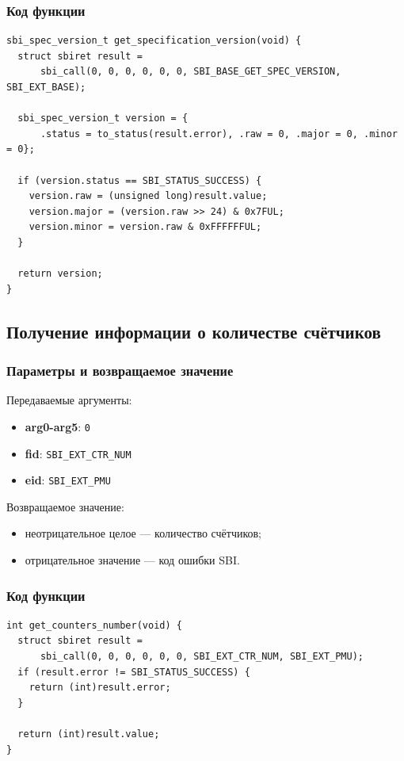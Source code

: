 \documentclass[12pt,a4paper]{report}
\begin{document}
\subsubsection*{Код функции}
\begin{verbatim}
sbi_spec_version_t get_specification_version(void) {
  struct sbiret result =
      sbi_call(0, 0, 0, 0, 0, 0, SBI_BASE_GET_SPEC_VERSION, SBI_EXT_BASE);

  sbi_spec_version_t version = {
      .status = to_status(result.error), .raw = 0, .major = 0, .minor = 0};

  if (version.status == SBI_STATUS_SUCCESS) {
    version.raw = (unsigned long)result.value;
    version.major = (version.raw >> 24) & 0x7FUL;
    version.minor = version.raw & 0xFFFFFFUL;
  }

  return version;
}
\end{verbatim}

\subsection*{Получение информации о количестве счётчиков}
\subsubsection*{Параметры и возвращаемое значение}
Передаваемые аргументы:
\begin{itemize}
    \item \textbf{arg0-arg5}: \texttt{0}
    \item \textbf{fid}: \texttt{SBI\_EXT\_CTR\_NUM}
    \item \textbf{eid}: \texttt{SBI\_EXT\_PMU}
\end{itemize}
Возвращаемое значение:
\begin{itemize}
    \item неотрицательное целое --- количество счётчиков;
    \item отрицательное значение --- код ошибки SBI.
\end{itemize}
\subsubsection*{Код функции}
\begin{verbatim}
int get_counters_number(void) {
  struct sbiret result =
      sbi_call(0, 0, 0, 0, 0, 0, SBI_EXT_CTR_NUM, SBI_EXT_PMU);
  if (result.error != SBI_STATUS_SUCCESS) {
    return (int)result.error;
  }

  return (int)result.value;
}
\end{verbatim}
\end{document}
